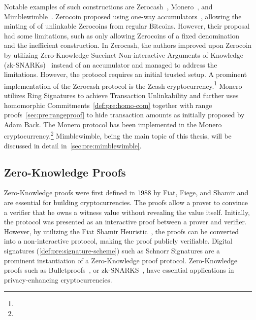 
Notable examples of such constructions are Zerocash~\cite{sasson2014zerocash}, Monero~\cite{noether2015ring}, and Mimblewimble~\cite{jedusor2016mimblewimble}.
Zerocoin proposed using one-way accumulators~\cite{benaloh1993one}, allowing the minting of of unlinkable Zerocoins from regular Bitcoins.
However, their proposal had some limitations, such as only allowing Zerocoins of a fixed denomination and the inefficient construction.
In Zerocash, the authors improved upon Zerocoin by utilizing Zero-Knowledge Succinct Non-interactive Arguments of Knowledge (zk-SNARKs)~\cite{bitansky2012extractable} instead of an accumulator and managed to address the limitations.
However, the protocol requires an initial trusted setup.
A prominent implementation of the Zerocash protocol is the Zcash cryptocurrency.\footnote{\urlzcash}
Monero utilizes Ring Signatures to achieve Transaction Unlinkability and further uses homomorphic Commitments~\cref{def:pre:homo-com} together with range proofs~\cref{sec:pre:rangeproof}  to hide transaction amounts as initially proposed by Adam Back.
The Monero protocol has been implemented in the Monero cryptocurrency.\footnote{\urlmonero}
Mimblewimble, being the main topic of this thesis, will be discussed in detail in~\cref{sec:pre:mimblewimble}.

\subsection{Zero-Knowledge Proofs} \label{sec:pre:privacy:zeroknowlegde}

Zero-Knowledge proofs were first defined in 1988 by Fiat, Fiege, and Shamir and are essential for building cryptocurrencies.
The proofs allow a prover to convince a verifier that he owns a witness value without revealing the value itself.
Initially, the protocol was presented as an interactive proof between a prover and verifier.
However, by utilizing the Fiat Shamir Heuristic~\cite{feige1988zero}, the proofs can be converted into a non-interactive protocol, making the proof publicly verifiable.
Digital signatures (\cref{def:pre:signature-scheme}) such as Schnorr Signatures are a prominent instantiation of a Zero-Knowledge proof protocol.
Zero-Knowledge proofs such as Bulletproofs~\cite{bunz2018bulletproofs}, or zk-SNARKS~\cite{bitansky2012extractable}, have essential applications in privacy-enhancing cryptocurrencies.

